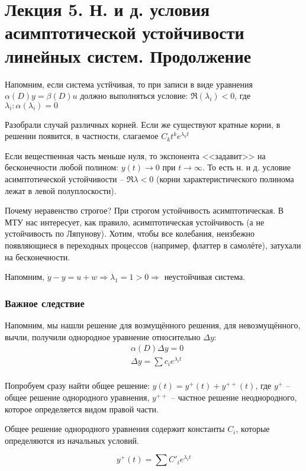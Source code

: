 \documentclass[main.tex]{subfiles}
\begin{document}
\section{Лекция 5. Н. и д. условия асимптотической устойчивости линейных систем. Продолжение}

Напомним, если система устйчивая, то при записи в виде уравнения $\alpha(D)y =\beta(D)u$ должно выполняться условие: $\Re(\lambda_i) < 0$, где $\lambda_i : \alpha(\lambda_i) = 0$

Разобрали случай различных корней.
Если же существуют кратные корни, в решении появится, в частности, слагаемое $ C_kt^k e^{\lambda_k t} $

Если вещественная часть меньше нуля, то экспонента <<задавит>> на бесконечности любой полином: $ y(t) \to 0 $ при $ t \to \infty $.
То есть н. и д. условие асимптотической устойчивости -- $ \boxed{\Re \lambda < 0} $ (корни характеристического полинома лежат в левой полуплоскости).

Почему неравенство строгое?
При строгом устойчивость асимптотическая.
В МТУ нас интересует, как правило, асимптотическая устойчивость (а не устойчивость по Ляпунову).
Хотим, чтобы все колебания, неизбежно появляющиеся в  переходных процессов (например, флаттер в самолёте), затухали на бесконечности.

Напомним, $ \dot y - y = u + w \Rightarrow \lambda_1 = 1 > 0 \Rightarrow $ неустойчивая система.

\subsubsection{Важное следствие}

Напомним, мы нашли решение для возмущённого решения, для невозмущённого, вычли, получили однородное уравнение относительно $ \Delta y $:
\begin{align*}
    & \alpha(D) \Delta y = 0 \\
    & \Delta y = \sum c_i e^{\lambda_i t} \\
\end{align*}

Попробуем сразу найти общее решение: $ y(t) = y^+(t) + y^{++}(t) $, где $y^+$ -- общее решение однородного уравнения, $y^{++}$ -- частное решение неоднородного, которое определяется видом правой части.

Общее решение однородного уравнения содержит константы $ C_i $, которые определяются из начальных условий.

$$ y^+(t) = \sum C'_i e^{\lambda_i t} $$
\end{document}
